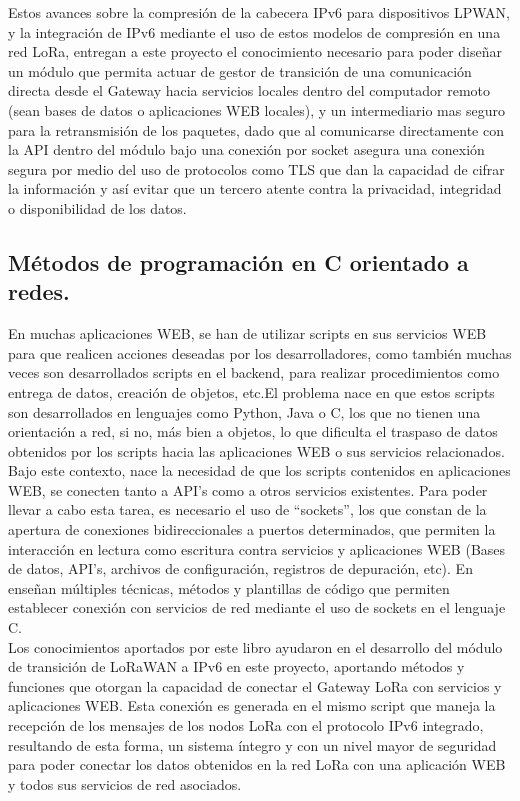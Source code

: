 \begin{justify}
Estos avances sobre la compresión de la cabecera IPv6 para dispositivos LPWAN, y la integración de IPv6 mediante el uso de estos modelos de compresión en una red LoRa, entregan a este proyecto el conocimiento necesario para poder diseñar un módulo que permita actuar de gestor de transición de una comunicación directa desde el Gateway hacia servicios locales dentro del computador remoto (sean bases de datos o aplicaciones WEB locales), y un intermediario mas seguro para la retransmisión de los paquetes, dado que al comunicarse directamente con la API dentro del módulo bajo una conexión por socket asegura una conexión segura por medio del uso de protocolos como TLS que dan la capacidad de cifrar la información y así evitar que un tercero atente contra la privacidad, integridad o disponibilidad de los datos.
\newpage
\subsection{Métodos de programación en C orientado a redes.}
En muchas aplicaciones WEB, se han de utilizar scripts en sus servicios WEB para que realicen acciones deseadas por los desarrolladores, como también muchas veces son desarrollados scripts en el backend, para realizar procedimientos como entrega de datos, creación de objetos, etc.El problema nace en que estos scripts son desarrollados en lenguajes como Python, Java o C, los que no tienen una orientación a red, si no, más bien a objetos, lo que dificulta el traspaso de datos obtenidos por los scripts hacia las aplicaciones WEB o sus servicios relacionados.\\
Bajo este contexto, nace la necesidad de que los scripts contenidos en aplicaciones WEB, se conecten tanto a API's como a otros servicios existentes. Para poder llevar a cabo esta tarea, es necesario el uso de ``sockets'', los que constan de la apertura de conexiones bidireccionales a puertos determinados, que permiten la interacción en lectura como escritura contra servicios y aplicaciones WEB (Bases de datos, API's, archivos de configuración, registros de depuración, etc). En \cite{network} enseñan múltiples técnicas, métodos y plantillas de código que permiten establecer conexión con servicios de red mediante el uso de sockets en el lenguaje C.\\
Los conocimientos aportados por este libro ayudaron en el desarrollo del módulo de transición de LoRaWAN a IPv6 en este proyecto, aportando métodos y funciones que otorgan la capacidad de conectar el Gateway LoRa con servicios y aplicaciones WEB. Esta conexión es generada en el mismo script que maneja la recepción de los mensajes de los nodos LoRa con el protocolo IPv6 integrado, resultando de esta forma, un sistema íntegro y con un nivel mayor de seguridad para poder conectar los datos obtenidos en la red LoRa con una aplicación WEB y todos sus servicios de red asociados.
\end{justify}